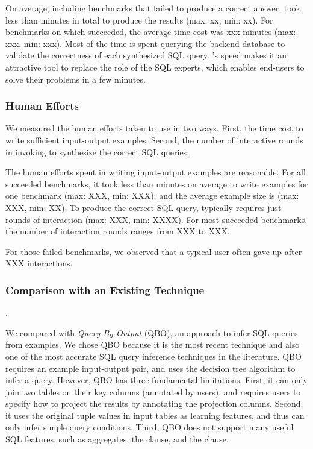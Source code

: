 On average,
including benchmarks that \ourtool failed to produce
a correct answer,
\ourtool took less than \avgtime minutes in total to
produce the results (max: xx, min: xx).
For benchmarks on which \ourtool succeeded, the average
time cost was xxx minutes (max: xxx, min: xxx).
Most of the time is spent querying the backend
database to validate the correctness of each synthesized  SQL query.
\ourtool's speed makes it an attractive tool to replace
the role of the SQL experts, which
enables end-users to solve their problems in a few
minutes.




\subsubsection{Human Efforts}
\label{sec:human}

We measured the human efforts taken to use \ourtool in two ways.
First, the time cost to write sufficient input-output examples. Second,
the number of interactive rounds in invoking \ourtool
to synthesize the correct SQL queries.

The human efforts spent in writing
input-output examples are reasonable. For
all succeeded benchmarks, it took less than
\avghum minutes on average to write examples
for one benchmark (max: XXX, min: XXX); and the
average example size is \avgtuple
(max: XXX, min: XX).
To produce the correct SQL query,
\ourtool typically requires just \avground rounds of
interaction (max: XXX, min: XXXX).
For most succeeded benchmarks, the number of interaction
rounds ranges from XXX to XXX.

For those failed benchmarks, we observed that
a typical user often gave up after XXX interactions.


\subsubsection{Comparison with an Existing Technique}.
\label{sec:comparison}

We compared \ourtool with \textit{Query By Output} (QBO), an
approach to infer SQL queries~\cite{Tran:2009} from examples.
We chose QBO because it is the most recent technique and also one
of the most accurate SQL query inference techniques in
the literature. QBO requires an example input-output pair, and
uses the decision tree algorithm to infer a query.
However, QBO has three fundamental limitations. First, 
it can only join two tables on their key columns (annotated by users), and requires
users to specify how to project the results
by annotating the projection columns.
Second, it uses the original tuple values
in input tables as learning features, and thus can only
infer simple query conditions. Third, QBO does not support
many useful SQL features, such as aggregates, the 
clause, and the  clause.

